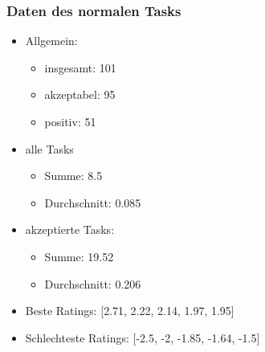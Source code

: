 \documentclass[]{beamer}
\begin{document}
\begin{frame}
	\frametitle{Daten des normalen Tasks}
	\begin{itemize}
		\item Allgemein:
		\begin{itemize}
			\item insgesamt: 101
			\item akzeptabel: 95
			\item positiv: 51
		\end{itemize}
		\item alle Tasks
		\begin{itemize}
			\item Summe: 8.5
			\item Durchschnitt: 0.085
		\end{itemize}
		
		\item akzeptierte Tasks:
		\begin{itemize}
			\item Summe: 19.52
			\item Durchschnitt: 0.206
		\end{itemize}
		
		\item Beste Ratings: [2.71, 2.22, 2.14, 1.97, 1.95]
		\item Schlechteste Ratings: [-2.5, -2, -1.85, -1.64, -1.5]
		
	\end{itemize}
\end{frame}
\end{document}
